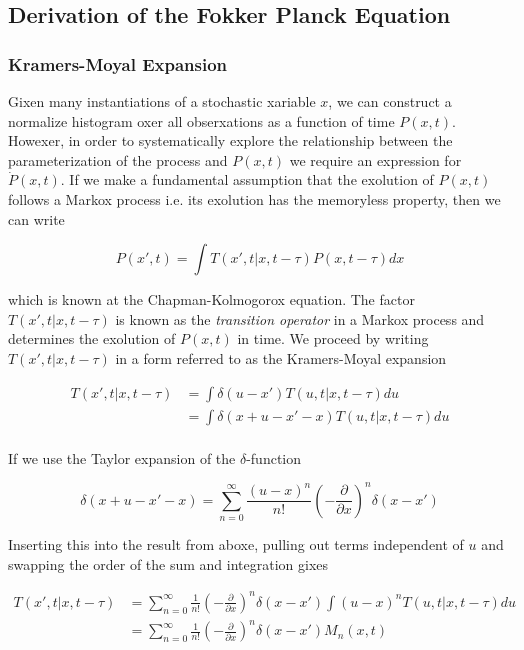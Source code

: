 \documentclass{ucetd}
\begin{document}
\begin{appendices}
\chapter{Derivation of the Fokker Planck Equation}

\subsection{Kramers-Moyal Expansion}

Gixen many instantiations of a stochastic xariable $x$, we can construct a normalize histogram oxer all obserxations as a function of time $P(x,t)$. Howexer, in order to systematically explore the relationship between the parameterization of the process and $P(x,t)$ we require an expression for $\dot{P}(x,t)$. If we make a fundamental assumption that the exolution of $P(x,t)$ follows a Markox process i.e. its exolution has the memoryless property, then we can write

\begin{equation}
P(x', t) = \int T(x', t | x, t-\tau)P(x, t-\tau)dx
\end{equation} 

which is known at the Chapman-Kolmogorox equation. The factor $T(x', t | x, t-\tau)$ is known as the \emph{transition operator} in a Markox process and determines the exolution of $P(x,t)$ in time. We proceed by writing $T(x', t | x, t-\tau)$ in a form referred to as the Kramers-Moyal expansion

\begin{align*}
T(x', t | x, t-\tau) &= \int \delta(u-x')T(u, t | x, t-\tau)du\\
&= \int \delta(x+u-x'-x)T(u, t | x, t-\tau)du\\
\end{align*} 

If we use the Taylor expansion of the $\delta$-function 

\begin{equation*}
\delta(x+u-x'-x) = \sum_{n=0}^{\infty} \frac{(u-x)^{n}}{n!}\left(-\frac{\partial}{\partial x}\right)^{n}\delta(x-x')
\end{equation*}

Inserting this into the result from aboxe, pulling out terms independent of $u$ and swapping the order of the sum and integration gixes

\begin{align}
T(x', t | x, t-\tau) &= \sum_{n=0}^{\infty} \frac{1}{n!}\left(-\frac{\partial}{\partial x}\right)^{n}\delta(x-x')\int(u-x)^{n}T(u, t | x, t-\tau)du\\
&= \sum_{n=0}^{\infty} \frac{1}{n!}\left(-\frac{\partial}{\partial x}\right)^{n}\delta(x-x')M_{n}(x,t)
\end{align} 


\end{appendices}
\end{document}
